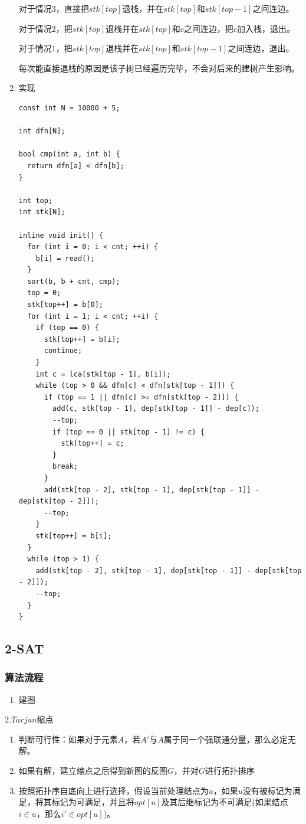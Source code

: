 \documentclass[11pt]{article}
\begin{document}
\begin{enumerate}
对于情况\(3\)，直接把\(stk[top]\)退栈，并在\(stk[top]\)和\(stk[top-1]\)之间连边。

对于情况\(2\)，把\(stk[top]\)退栈并在\(stk[top]\)和\(c\)之间连边，把\(c\)加入栈，退出。

对于情况\(1\)，把\(stk[top]\)退栈并在\(stk[top]\)和\(stk[top-1]\)之间连边，退出。

每次能直接退栈的原因是该子树已经遍历完毕，不会对后来的建树产生影响。

\item 实现
\label{sec:org0e94273}

\begin{verbatim}
const int N = 10000 + 5;

int dfn[N];

bool cmp(int a, int b) {
  return dfn[a] < dfn[b];
}

int top;
int stk[N];

inline void init() {
  for (int i = 0; i < cnt; ++i) {
    b[i] = read();
  }
  sort(b, b + cnt, cmp);
  top = 0;
  stk[top++] = b[0];
  for (int i = 1; i < cnt; ++i) {
    if (top == 0) {
      stk[top++] = b[i];
      continue;
    }
    int c = lca(stk[top - 1], b[i]);
    while (top > 0 && dfn[c] < dfn[stk[top - 1]]) {
      if (top == 1 || dfn[c] >= dfn[stk[top - 2]]) {
        add(c, stk[top - 1], dep[stk[top - 1]] - dep[c]);
        --top;
        if (top == 0 || stk[top - 1] != c) {
          stk[top++] = c;
        }
        break;
      }
      add(stk[top - 2], stk[top - 1], dep[stk[top - 1]] - dep[stk[top - 2]]);
      --top;
    }
    stk[top++] = b[i];
  }
  while (top > 1) {
    add(stk[top - 2], stk[top - 1], dep[stk[top - 1]] - dep[stk[top - 2]]);
    --top;
  }
}
\end{verbatim}
\end{enumerate}
\subsection{2-SAT}
\label{sec:org661a7aa}
\subsubsection{算法流程}
\label{sec:org3db5ed7}

\begin{enumerate}
\item 建图
\end{enumerate}
2.\(Tarjan\)缩点
\begin{enumerate}
\item 判断可行性：如果对于元素\(A\)，若\(A'\)与\(A\)属于同一个强联通分量，那么必定无解。
\item 如果有解，建立缩点之后得到新图的反图\(G\)，并对\(G\)进行拓扑排序
\item 按照拓扑序自底向上进行选择，假设当前处理结点为\(u\)，如果\(u\)没有被标记为满足，将其标记为可满足，并且将\(opt[u]\)及其后继标记为不可满足(如果结点\(i \in u\)，那么\(i' \in opt[u]\))。
\end{enumerate}
\end{document}
